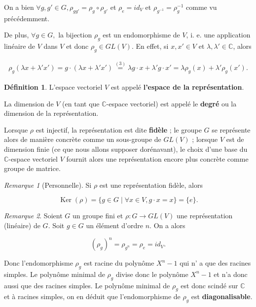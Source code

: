 \documentclass[french]{book}
\theoremstyle{definition}
\newtheorem{protodefinition}{Définition}[section]
\newenvironment{definition}
    {\colorlet{shadecolor}{green!5}\begin{shaded}\begin{protodefinition}}
    {\end{protodefinition}\end{shaded}}
\theoremstyle{remark}
\newtheorem*{remark}{Remarque}
\begin{document}
On a bien $\forall g, g' \in G, \rho _{gg'} = \rho_g \circ \rho _{g'}$ et $\rho_e=id_V$ et $\rho _{g ^{-1} } = \rho_g ^{-1} $ comme vu précédemment.

De plus, $\forall  g \in G, $ la bijection $\rho_g$ est un endomorphisme de $V$, i. e. une application linéaire de $V$ dans $V$ et donc $\rho_g \in GL(V)$. En effet, si $x, x' \in V$ et $\lambda , \lambda' \in \mathbb{C}$, alors

\begin{gather*}
  \rho_g(\lambda x + \lambda' x') = g \cdot(\lambda x+ \lambda'x') \stackrel{(3)}{=} \lambda g \cdot x + \lambda' g \cdot x' = \lambda \rho_g(x) + \lambda'\rho_g(x').
\end{gather*}

\begin{definition}
  L'espace vectoriel $V$ est appelé \textbf{l'espace de la représentation}.

  La dimension de $V$ (en tant que $\mathbb{C}$-espace vectoriel) est appelé le \textbf{degré} ou la dimension de la représentation.

  Lorsque $\rho$ est injectif, la représentation est dite \textbf{fidèle} ; le groupe $G$ se représente alors de manière concrète comme un sous-groupe de $GL(V)$ ; lorsque $V$ est de dimension finie (ce que nous allons supposer dorénavant), le choix d'une base du $\mathbb{C}$-espace vectoriel $V$ fournit alors une représentation encore plus concrète comme groupe de matrice.
\end{definition}

\begin{remark}[Personnelle]
  Si \(\rho\) est une représentation fidèle, alors

  \[\operatorname{Ker}(\rho) = \{ g \in G \mid \forall x \in V, g \cdot x = x \} = \{ e \}. \]
\end{remark}

\begin{remark}
  Soient $G$ un groupe fini et $\rho : G \to GL(V)$ une représentation (linéaire) de $G$. Soit $g \in G$ un élément d'ordre $n$. On a alors

  \[
  (\rho_g)^n = \rho _{g ^{n}} = \rho_e = id_V.
  \]

  Donc l'endomorphisme $\rho_g$ est racine du polynôme $X^{n}-1$ qui n' a que des racines simples. Le polynôme minimal de $\rho_g$ divise donc le polynôme $X ^{n}-1$ et n'a donc aussi que des racines simples. Le polynôme minimal de $\rho_g$ est donc scindé sur $\mathbb{C}$ et à racines simples, on en déduit que l'endomorphisme de $\rho_g$ est \textbf{diagonalisable}.
\end{remark}
\end{document}
